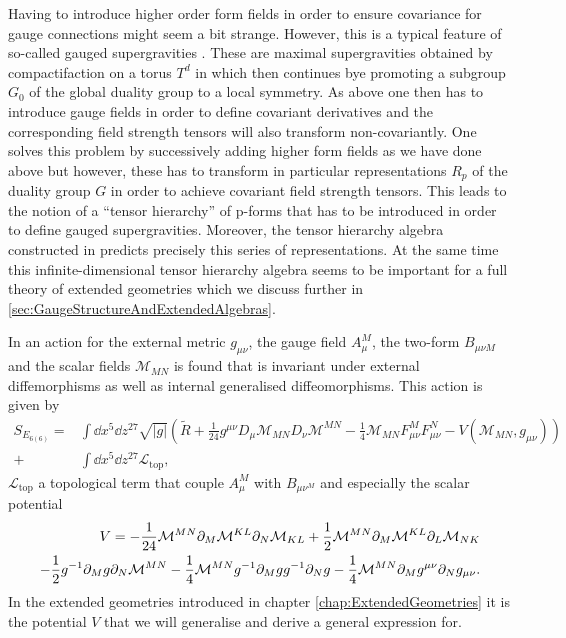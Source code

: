 Having to introduce higher order form fields in order to ensure covariance for gauge connections might seem a bit strange. However, this is a typical feature of so-called gauged supergravities \cite{deWitTensorHierarchies2008}. These are maximal supergravities obtained by compactifaction on a torus $T^d$ in which then continues bye promoting a subgroup $G_0$ of the global duality group to a local symmetry. As above one then has to introduce gauge fields in order to define covariant derivatives and the corresponding field strength tensors will also transform non-covariantly. One solves this problem by successively adding higher form fields as we have done above but however, these has to transform in particular representations $R_p$ of the duality group $G$ in order to achieve covariant field strength tensors. This leads to the notion of a ``tensor hierarchy'' of p-forms that has to be introduced in order to define gauged supergravities. Moreover, the tensor hierarchy algebra constructed in \cite{Palmkvist:2013vya} predicts precisely this series of representations. At the same time this infinite-dimensional tensor hierarchy algebra seems to be important for a full theory of extended geometries which we discuss further in \ref{sec:GaugeStructureAndExtendedAlgebras}. 

In \cite{E62014} an action for the external metric $g_{\mu\nu}$, the gauge field $A^M_\mu$, the two-form $B_{\mu\nu M}$ and the scalar fields $\mathcal{M}_{MN}$ is found that is invariant under external diffemorphisms as well as internal generalised diffeomorphisms. This action is given by 
\begin{equation}\label{eq:E6Action}\begin{aligned}
    S_{E_{6(6)}} = &\int \dd x^5\dd z^{27} \sqrt{|g|}\left(\tilde{R}+\frac{1}{24}g^{\mu\nu}D_\mu \mathcal{M}_{MN}D_\nu\mathcal{M}^{MN}-\frac{1}{4}\mathcal{M}_{MN}F^M_{\mu\nu}F^N_{\mu\nu}-V(\mathcal{M}_{MN},g_{\mu\nu})\right)\\
    +&\int \dd x^5\dd z^{27}\mathcal{L}_{\text{top}},
    \end{aligned}
\end{equation}
$\mathcal{L}_{\text{top}}$ a topological term that couple $A_\mu^M$ with $B_{\mu\nu^M}$ and especially the scalar potential 
\begin{equation}
    \begin{aligned}
    V = -\frac{1}{24}\mathcal{M}^{MN}\partial_M\mathcal{M}^{KL}\partial_N\mathcal{M}_{KL}+\frac{1}{2}\mathcal{M}^{MN}\partial_M\mathcal{M}^{KL}\partial_L\mathcal{M}_{NK}\\
    -\frac{1}{2}g^{-1}\partial_M g\partial_N\mathcal{M}^{MN}-\frac{1}{4}\mathcal{M}^{MN}g^{-1}\partial_Mgg^{-1}\partial_Ng-\frac{1}{4}\mathcal{M}^{MN}\partial_Mg^{\mu\nu}\partial_Ng_{\mu\nu}. 
    \end{aligned}
\end{equation}
In the extended geometries introduced in chapter \ref{chap:ExtendedGeometries} it is the potential $V$ that we will generalise and derive a general expression for. 


